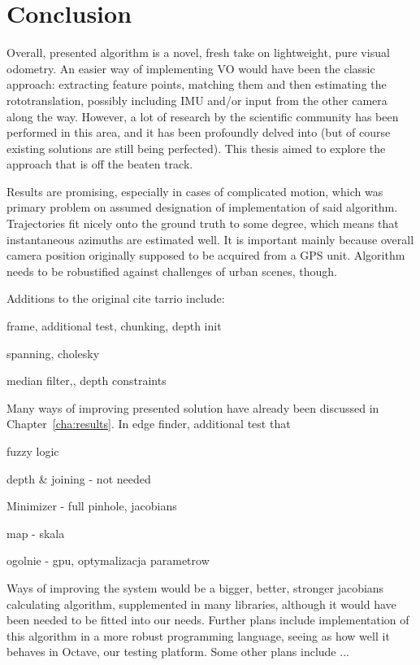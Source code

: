 \chapter{Conclusion}

Overall, presented algorithm is a novel, fresh take on lightweight, pure visual odometry. An easier way of implementing VO would have been the classic approach: extracting feature points, matching them and then estimating the rototranslation, possibly including IMU and/or input from the other camera along the way. However, a lot of research by the scientific community has been performed in this area, and it has been profoundly delved into (but of course existing solutions are still being perfected). This thesis aimed to explore the approach that is off the beaten track.

Results are promising, especially in cases of complicated motion, which was primary problem on assumed designation of implementation of said algorithm. Trajectories fit nicely onto the ground truth to some degree, which means that instantaneous azimuths are estimated well. It is important mainly because overall camera position originally supposed to be acquired from a GPS unit. Algorithm needs to be robustified against challenges of urban scenes, though.

Additions to the original cite tarrio include:

frame, additional test, chunking, depth init 

spanning, cholesky

median filter,, depth constraints


Many ways of improving presented solution have already been discussed in Chapter~\ref{cha:results}. In edge finder, additional test that 

fuzzy logic

depth \& joining - not needed

Minimizer - full pinhole, jacobians

map - skala

ogolnie - gpu, optymalizacja parametrow

Ways of improving the system would be a bigger, better, stronger jacobians calculating algorithm, supplemented in many libraries, although it would have been needed to be fitted into our needs. Further plans include implementation of this algorithm in a more robust programming language, seeing as how well it behaves in Octave, our testing platform. Some other plans include ...

